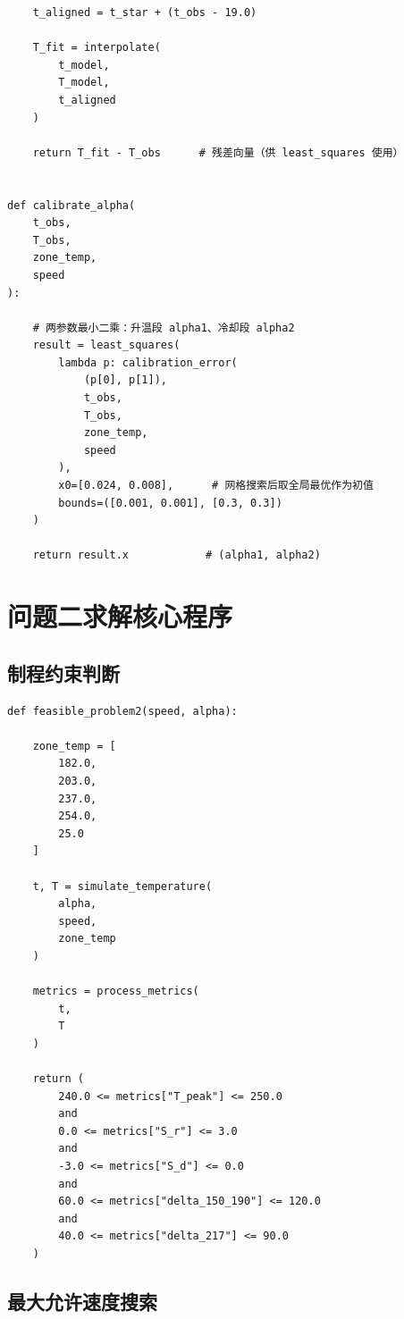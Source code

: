 \documentclass{cumcmthesis}
\begin{document}
\begin{appendices}
\begin{verbatim}
    t_aligned = t_star + (t_obs - 19.0)

    T_fit = interpolate(
        t_model,
        T_model,
        t_aligned
    )

    return T_fit - T_obs      # 残差向量（供 least_squares 使用）


def calibrate_alpha(
    t_obs,
    T_obs,
    zone_temp,
    speed
):

    # 两参数最小二乘：升温段 alpha1、冷却段 alpha2
    result = least_squares(
        lambda p: calibration_error(
            (p[0], p[1]),
            t_obs,
            T_obs,
            zone_temp,
            speed
        ),
        x0=[0.024, 0.008],      # 网格搜索后取全局最优作为初值
        bounds=([0.001, 0.001], [0.3, 0.3])
    )

    return result.x            # (alpha1, alpha2)
\end{verbatim}



\section{问题二求解核心程序}

\subsection{制程约束判断}

\begin{verbatim}
def feasible_problem2(speed, alpha):

    zone_temp = [
        182.0,
        203.0,
        237.0,
        254.0,
        25.0
    ]

    t, T = simulate_temperature(
        alpha,
        speed,
        zone_temp
    )

    metrics = process_metrics(
        t,
        T
    )

    return (
        240.0 <= metrics["T_peak"] <= 250.0
        and
        0.0 <= metrics["S_r"] <= 3.0
        and
        -3.0 <= metrics["S_d"] <= 0.0
        and
        60.0 <= metrics["delta_150_190"] <= 120.0
        and
        40.0 <= metrics["delta_217"] <= 90.0
    )
\end{verbatim}


\subsection{最大允许速度搜索}


\end{appendices}
\end{document}
